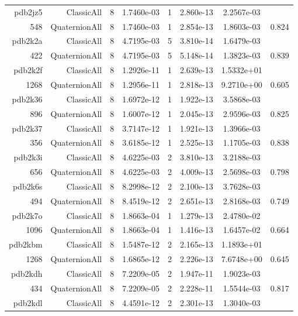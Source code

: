 \begin{xltabular}{\textwidth}{r|rcS[table-format=1.4e+2]cS[table-format=1.3e+2]S[table-format=1.4e+2]S[table-format=-1.3]}
pdb2jz5 & ClassicAll & 8 & 1.7460e-03 & 1 & 2.860e-13 & 2.2567e-03 & \\
548 & QuaternionAll & 8 & 1.7460e-03 & 1 & 2.854e-13 & 1.8603e-03 & 0.824\\  \addlinespace
pdb2k2a & ClassicAll & 8 & 4.7195e-03 & 5 & 3.810e-14 & 1.6479e-03 & \\
422 & QuaternionAll & 8 & 4.7195e-03 & 5 & 5.148e-14 & 1.3823e-03 & 0.839\\  \addlinespace
{\color{red} pdb2k2f } & ClassicAll & 8 & 1.2926e-11 & 1 & 2.639e-13 & 1.5332e+01 & \\
1268 & QuaternionAll & 8 & 1.2956e-11 & 1 & 2.818e-13 & 9.2710e+00 & 0.605\\  \addlinespace
pdb2k36 & ClassicAll & 8 & 1.6972e-12 & 1 & 1.922e-13 & 3.5868e-03 & \\
896 & QuaternionAll & 8 & 1.6007e-12 & 1 & 2.045e-13 & 2.9596e-03 & 0.825\\  \addlinespace
pdb2k37 & ClassicAll & 8 & 3.7147e-12 & 1 & 1.921e-13 & 1.3966e-03 & \\
356 & QuaternionAll & 8 & 3.6185e-12 & 1 & 2.525e-13 & 1.1705e-03 & 0.838\\  \addlinespace
pdb2k3i & ClassicAll & 8 & 4.6225e-03 & 2 & 3.810e-13 & 3.2188e-03 & \\
656 & QuaternionAll & 8 & 4.6225e-03 & 2 & 4.009e-13 & 2.5698e-03 & 0.798\\  \addlinespace
pdb2k6s & ClassicAll & 8 & 8.2998e-12 & 2 & 2.100e-13 & 3.7628e-03 & \\
494 & QuaternionAll & 8 & 8.4519e-12 & 2 & 2.651e-13 & 2.8168e-03 & 0.749\\  \addlinespace
pdb2k7o & ClassicAll & 8 & 1.8663e-04 & 1 & 1.279e-13 & 2.4780e-02 & \\
1096 & QuaternionAll & 8 & 1.8663e-04 & 1 & 1.416e-13 & 1.6457e-02 & 0.664\\  \addlinespace
{\color{red} pdb2kbm } & ClassicAll & 8 & 1.5487e-12 & 2 & 2.165e-13 & 1.1893e+01 & \\
1268 & QuaternionAll & 8 & 1.6865e-12 & 2 & 2.226e-13 & 7.6748e+00 & 0.645\\  \addlinespace
pdb2kdh & ClassicAll & 8 & 7.2209e-05 & 2 & 1.947e-11 & 1.9023e-03 & \\
434 & QuaternionAll & 8 & 7.2209e-05 & 2 & 2.228e-11 & 1.5544e-03 & 0.817\\  \addlinespace
pdb2kdl & ClassicAll & 8 & 4.4591e-12 & 2 & 2.301e-13 & 1.3040e-03 & \\

\end{xltabular}
